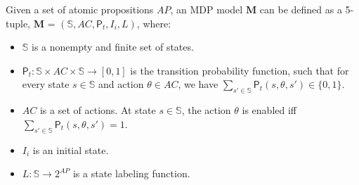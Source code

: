 \begin{definition}[MDP]\label{def:MDP}

Given a set of atomic propositions $AP$, an MDP model $\mathbf{M}$ can be defined as a 5-tuple, $\mathbf{M}$ = $(\mathbb{S}, AC, \textsf{P}_t ,I_i, L)$, where:

\begin{itemize}

  \item  $\mathbb{S}$ is a nonempty and finite set of states.

  \item  $\textsf{P}_t:  \mathbb{S}\times AC\times \mathbb{S}\rightarrow[0,1]$ is the transition probability function, such that for every state $s\in{\mathbb{S}}$ and action $\theta \in AC$, we have $\sum_{s' \in{\mathbb{S}}} \textsf{P}_t(s,\theta ,s') \in \{0,1\}$.

  \item  $AC $ is a set of actions. At state $s \in \mathbb{S}$, the action $\theta$ is enabled iff $\sum_{s' \in{\mathbb{S}}} \textsf{P}_t(s,\theta ,s')=1$.

  \item  $I_i$ is an initial state.

  \item  $L : \mathbb{S}\rightarrow 2^{AP}$  is a state labeling function.
\end{itemize}
\end{definition}

